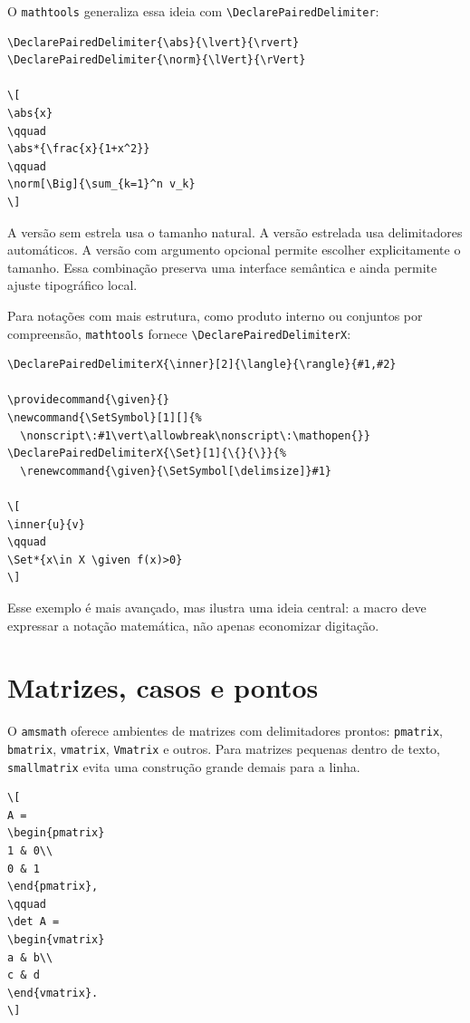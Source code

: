 O \texttt{mathtools} generaliza essa ideia com \verb|\DeclarePairedDelimiter|:

\begin{lstlisting}[language={[latex]TeX}, caption={Delimitadores com mathtools}]
\DeclarePairedDelimiter{\abs}{\lvert}{\rvert}
\DeclarePairedDelimiter{\norm}{\lVert}{\rVert}

\[
\abs{x}
\qquad
\abs*{\frac{x}{1+x^2}}
\qquad
\norm[\Big]{\sum_{k=1}^n v_k}
\]
\end{lstlisting}

A versão sem estrela usa o tamanho natural. A versão estrelada usa delimitadores automáticos. A versão com argumento opcional permite escolher explicitamente o tamanho. Essa combinação preserva uma interface semântica e ainda permite ajuste tipográfico local.

Para notações com mais estrutura, como produto interno ou conjuntos por compreensão, \texttt{mathtools} fornece \verb|\DeclarePairedDelimiterX|:

\begin{lstlisting}[language={[latex]TeX}, caption={Produto interno e conjunto por compreensão}]
\DeclarePairedDelimiterX{\inner}[2]{\langle}{\rangle}{#1,#2}

\providecommand{\given}{}
\newcommand{\SetSymbol}[1][]{%
  \nonscript\:#1\vert\allowbreak\nonscript\:\mathopen{}}
\DeclarePairedDelimiterX{\Set}[1]{\{}{\}}{%
  \renewcommand{\given}{\SetSymbol[\delimsize]}#1}

\[
\inner{u}{v}
\qquad
\Set*{x\in X \given f(x)>0}
\]
\end{lstlisting}

Esse exemplo é mais avançado, mas ilustra uma ideia central: a macro deve expressar a notação matemática, não apenas economizar digitação.

\section{Matrizes, casos e pontos}

O \texttt{amsmath} oferece ambientes de matrizes com delimitadores prontos: \texttt{pmatrix}, \texttt{bmatrix}, \texttt{vmatrix}, \texttt{Vmatrix} e outros. Para matrizes pequenas dentro de texto, \texttt{smallmatrix} evita uma construção grande demais para a linha.

\begin{lstlisting}[language={[latex]TeX}, caption={Matrizes com amsmath}]
\[
A =
\begin{pmatrix}
1 & 0\\
0 & 1
\end{pmatrix},
\qquad
\det A =
\begin{vmatrix}
a & b\\
c & d
\end{vmatrix}.
\]
\end{lstlisting}

